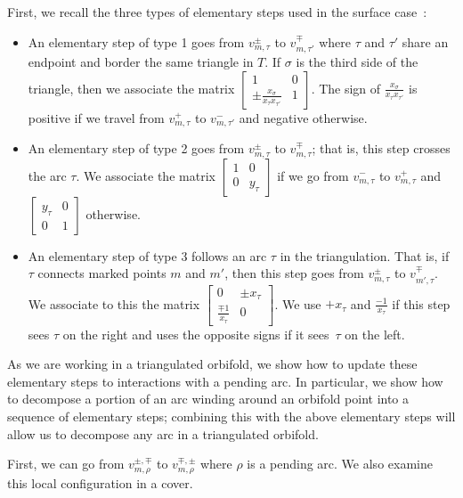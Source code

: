 First, we recall the three types of elementary steps used in the surface case~\cite{MW}:
\begin{itemize}\itemsep=0pt
 \item An elementary step of type 1 goes from $v^\pm_{m,\tau}$ to $v^\mp_{m,\tau'}$ where $\tau$ and $\tau'$ share an endpoint and border the same triangle in $T$. If $\sigma$ is the third side of the triangle, then we associate the matrix $\left[\begin{smallmatrix} 1 & 0 \\ \pm \frac{x_{\sigma}}{x_\tau x_{\tau'}} & 1 \end{smallmatrix}\right]$. The sign of $\frac{x_{\sigma}}{x_\tau x_{\tau'}}$ is positive if we travel from $v^+_{m,\tau}$ to $v^-_{m,\tau'}$ and negative otherwise.
 \item An elementary step of type 2 goes from $v^\pm_{m,\tau}$ to $v^\mp_{m,\tau}$; that is, this step crosses the arc $\tau$. We associate the matrix $\left[\begin{smallmatrix} 1 & 0 \\ 0 & y_\tau \end{smallmatrix}\right]$ if we go from $v^-_{m,\tau}$ to $v^+_{m,\tau}$ and $\left[\begin{smallmatrix} y_\tau & 0 \\ 0 & 1 \end{smallmatrix}\right]$ otherwise.
 \item An elementary step of type 3 follows an arc $\tau$ in the triangulation. That is, if $\tau$ connects marked points $m$ and $m'$, then this step goes from $v^\pm_{m, \tau}$ to $v^\mp_{m',\tau}$. We associate to this the matrix $\left[\begin{smallmatrix} 0 & \pm x_\tau \\ \frac{\mp 1}{x_\tau} & 0 \end{smallmatrix}\right]$. We use $+ x_\tau$ and $\frac{-1}{x_\tau}$ if this step sees $\tau$ on the right and uses the opposite signs if it sees~$\tau$ on the left.
\end{itemize}

As we are working in a triangulated orbifold, we show how to update these elementary steps to interactions with a pending arc. In particular, we show how to decompose a portion of an arc winding around an orbifold point into a sequence of elementary steps; combining this with the above elementary steps will allow us to decompose any arc in a triangulated orbifold.

First, we can go from $v^{\pm,\mp}_{m,\rho}$ to $v^{\mp,\pm}_{m,\rho}$ where $\rho$ is a pending arc. We also examine this local configuration in a cover.

